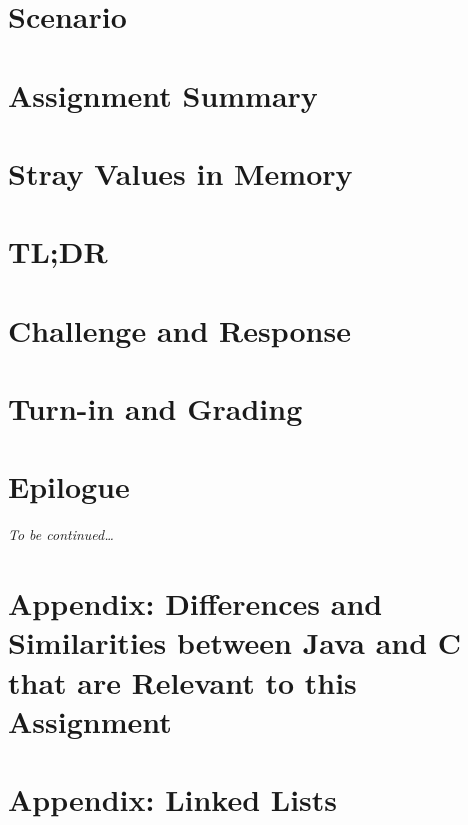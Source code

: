 \documentclass[12pt]{article}
\begin{document}
    \labidentifier


    \softwareengineeringfrontmatter

    \section*{Scenario}                                             \scenariointroduction

    \section{Assignment Summary}                                    

    \section{Stray Values in Memory} \label{sec:archiesCode}        

    \section{TL;DR} \label{sec:tldr}                                

    \section{Challenge and Response} \label{sec:challengeResponse}  

    \section{Turn-in and Grading}                                   

    \section*{Epilogue}                                             \scenariowrapup

    \textit{To be continued\dots}

    \newpage\appendix

    \section{Appendix: Differences and Similarities between Java and C that are Relevant to this Assignment}
                                                                    

    \section{Appendix: Linked Lists} \label{sec:linkedLists}        
\end{document}
